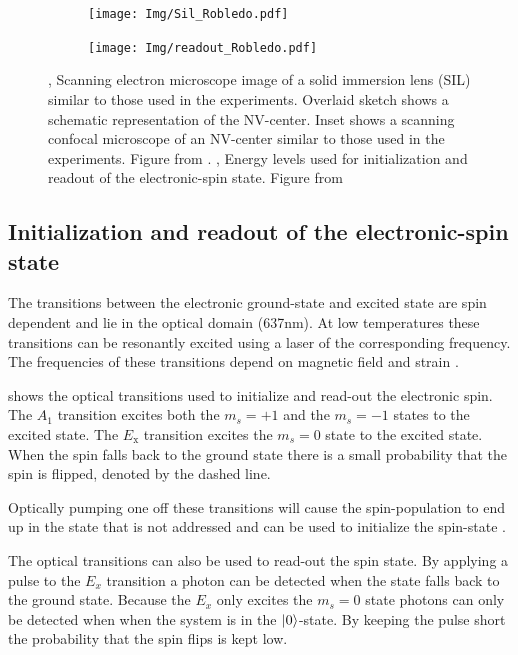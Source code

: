 \begin{figure}[htbp]
    \centering
    \begin{subfigure}[t]{0.49\textwidth}\centering
        \caption{}
        \label{fig:Sil_Robledo}
        \texttt{[image: Img/Sil\_Robledo.pdf]}
    \end{subfigure}
    \begin{subfigure}[t]{0.49\textwidth}\centering
       \caption{}
       \label{fig:readoutRobledo}
       \texttt{[image: Img/readout\_Robledo.pdf]}
   \end{subfigure}
   \caption{, Scanning electron microscope image of  a solid immersion lens (SIL) similar to those used in the experiments. Overlaid sketch shows a schematic representation of the NV-center. Inset shows a scanning confocal microscope of an NV-center similar to those used in the experiments. Figure from \citep{Robledo2011HighFidelity}.  , Energy levels used for initialization and readout of the electronic-spin state. Figure from \citep{Robledo2011HighFidelity}}
\end{figure}

\subsection{Initialization and readout of the electronic-spin state}
The transitions between the electronic ground-state and excited state are spin dependent and lie in the optical domain (637nm).
At low temperatures these transitions can be resonantly excited using a laser of the corresponding frequency.
The frequencies of these transitions depend on magnetic field and strain \citep{Hensen2011MeasurementBased}.

 shows the optical transitions used to initialize and read-out the electronic spin.
The $A_1$ transition excites both the $m_s =+1$ and the $m_s=-1$ states to the excited state.
The $E_\mathrm{x}$ transition excites the $m_s = 0$ state to the excited state.
When the spin falls back to the ground state there is a small probability that the spin is flipped, denoted by the dashed line.

Optically pumping one off these transitions will cause the spin-population to end up in the state that is not addressed and can be used to initialize the spin-state \citep{Robledo2011HighFidelity}.

The optical transitions can also be used to read-out the spin state.
By applying a pulse to the $E_x$ transition a photon can be detected when the state falls back to the ground state.
Because the $E_x$ only excites the $m_s=0$ state photons can only be detected when when the system is in the ${\left\vert{0}\right\rangle}$-state.
By keeping the pulse short the probability that the spin flips is kept low.

